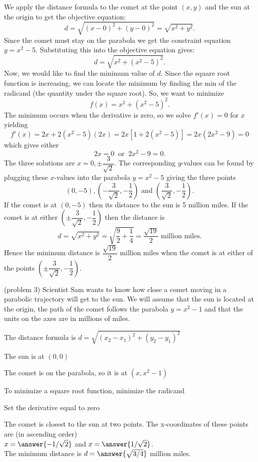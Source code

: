 \documentclass{ximera}
\begin{document}
\begin{example}[example 3]
We apply the distance formula to the comet at the point $(x, y)$ and the sun at the origin to get the objective equation:
\[d = \sqrt{(x-0)^2 + (y-0)^2} = \sqrt{x^2 + y^2}.\]
Since the comet must stay on the parabola we get the constraint equation $y = x^2 - 5$.  Substituting this into the objective equation gives:
\[d = \sqrt{x^2 + (x^2 - 5)^2}.\]
Now, we would like to find the minimum value of $d$. Since the square root function is increasing, 
we can locate the minimum by finding the min of the radicand (the quantity under the square root).
So, we want to minimize 
\[
f(x) = x^2 + (x^2 - 5)^2.
\]
The minimum occurs when the derivative is zero, so we solve
$f'(x) = 0$ for $x$ yielding
\[f'(x) = 2x + 2(x^2 - 5)(2x) = 2x[1+ 2(x^2 - 5)] = 2x(2x^2 - 9) = 0\]
which gives either 
\[2x = 0 \;\; \text{or} \;\; 2x^2 - 9 = 0.\]
The three solutions are $x = 0, \pm \dfrac{3}{\sqrt2}$.
The corresponding $y$-values can be found by plugging these $x$-values into the parabola $y = x^2 - 5$
giving the three points
\[(0, -5), \left(-\dfrac{3}{\sqrt 2}, -\dfrac12 \right) \mbox{ and } \left(\dfrac{3}{\sqrt 2}, -\dfrac12 \right).\]
If the comet is at $(0, -5)$ then its distance to the sun is 5 million miles.  If the comet is at 
either $\left(\pm\dfrac{3}{\sqrt 2}, -\dfrac12\right)$ then the distance is 
\[d = \sqrt{x^2 + y^2} = \sqrt{{\frac{9}{2} + \frac14}} = \frac{\sqrt {19}}{2} \mbox{ million miles}.\]
Hence the minimum distance is $\dfrac{\sqrt{19}}{2}$ million miles when the comet is at either of the points 
$\left(\pm\dfrac{3}{\sqrt 2}, -\dfrac12 \right)$.
\end{example}

\begin{problem}(problem 3)
Scientist Sam wants to know how close a comet moving in a parabolic trajectory will get to the sun. 
We will assume that the sun is located at the origin, 
the path of the comet follows the parabola $y = x^2 - 1$ and that the units 
on the axes are in millions of miles.



\begin{hint}
The distance formula is $d = \sqrt{(x_2 - x_1)^2 + (y_2 - y_1)^2}$
\end{hint}
\begin{hint}
The sun is at $(0,0)$
\end{hint}
\begin{hint}
The comet is on the parabola, so it is at $(x, x^2 - 1)$
\end{hint}
\begin{hint}
To minimize a square root function, minimize the radicand
\end{hint}
\begin{hint}
Set the derivative equal to zero
\end{hint}

The comet is closest to the sun at two points.
 The x-coordinates of these points are (in ascending order)\\
$x =  \answer{-1/\sqrt2}$ and $x = \answer{1/\sqrt2}$.\\
The minimum distance is $d = \answer{\sqrt{3/4}}$ million miles.
\end{problem}
\end{document}
